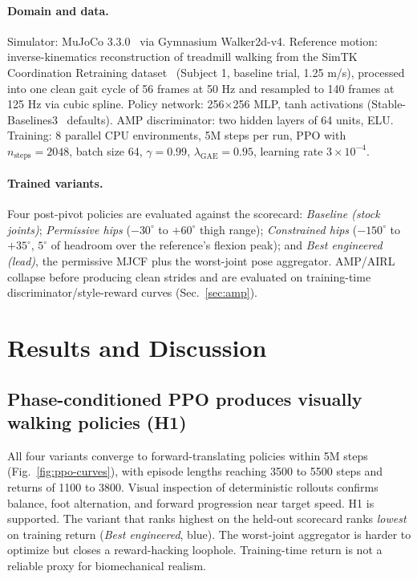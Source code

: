 \documentclass{article}
\begin{document}
\paragraph{Domain and data.}
Simulator: MuJoCo 3.3.0~\cite{todorov2012mujoco} via Gymnasium
Walker2d-v4. Reference motion: inverse-kinematics reconstruction of
treadmill walking from the SimTK Coordination Retraining
dataset~\cite{simtkulrich} (Subject 1, baseline trial, 1.25 m/s),
processed into one clean gait cycle of 56 frames at 50 Hz and
resampled to 140 frames at 125 Hz via cubic spline. Policy network:
256$\times$256 MLP, tanh activations
(Stable-Baselines3~\cite{raffin2021sb3} defaults). AMP discriminator:
two hidden layers of 64 units, ELU. Training: 8 parallel CPU
environments, 5M steps per run, PPO with $n_\text{steps} = 2048$,
batch size 64, $\gamma = 0.99$, $\lambda_\text{GAE} = 0.95$, learning
rate $3\times10^{-4}$.

\paragraph{Trained variants.}
Four post-pivot policies are evaluated against the scorecard:
\emph{Baseline (stock joints)};
\emph{Permissive hips} ($-30^\circ$ to $+60^\circ$ thigh range);
\emph{Constrained hips} ($-150^\circ$ to $+35^\circ$, $5^\circ$
of headroom over the reference's flexion peak); and
\emph{Best engineered (lead)}, the permissive MJCF plus the
worst-joint pose aggregator. AMP/AIRL collapse before producing
clean strides and are evaluated on training-time
discriminator/style-reward curves (Sec.~\ref{sec:amp}).

\section{Results and Discussion}
\label{sec:results}

\subsection{Phase-conditioned PPO produces visually walking policies (H1)}
\label{sec:results-h1}

All four variants converge to forward-translating policies within
5M steps (Fig.~\ref{fig:ppo-curves}), with episode lengths
reaching 3500 to 5500 steps and returns of 1100 to 3800. Visual
inspection of deterministic rollouts confirms balance, foot
alternation, and forward progression near target speed. H1 is
supported. The variant that ranks highest on the held-out
scorecard ranks \emph{lowest} on training return (\emph{Best
engineered}, blue). The worst-joint aggregator is harder to
optimize but closes a reward-hacking loophole. Training-time
return is not a reliable proxy for biomechanical realism.
\end{document}
